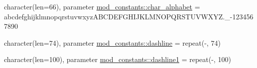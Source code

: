 \begin{DoxyCompactItemize}
character(len=66), parameter \hyperlink{namespacemod__constants_a1d9e53f57f87f727d4dd13f1dd4b8e45}{mod\+\_\+constants\+::char\+\_\+alphabet} = \textquotesingle{}abcdefghijklmnopqrstuvwxyz\+A\+B\+C\+D\+E\+F\+G\+H\+I\+J\+K\+L\+M\+N\+O\+P\+Q\+R\+S\+T\+U\+V\+W\+X\+Y\+Z.\+\_\+-\/1234567890 \textquotesingle{}
\item 
character(len=74), parameter \hyperlink{namespacemod__constants_ab55dac3c52ff6b1034697c6e83ac76d8}{mod\+\_\+constants\+::dashline} = repeat(\textquotesingle{}-\/\textquotesingle{}, 74)
\item 
character(len=100), parameter \hyperlink{namespacemod__constants_ad292a8f1897875585bad7d5f454cf64a}{mod\+\_\+constants\+::dashline1} = repeat(\textquotesingle{}-\/\textquotesingle{}, 100)
\end{DoxyCompactItemize}
